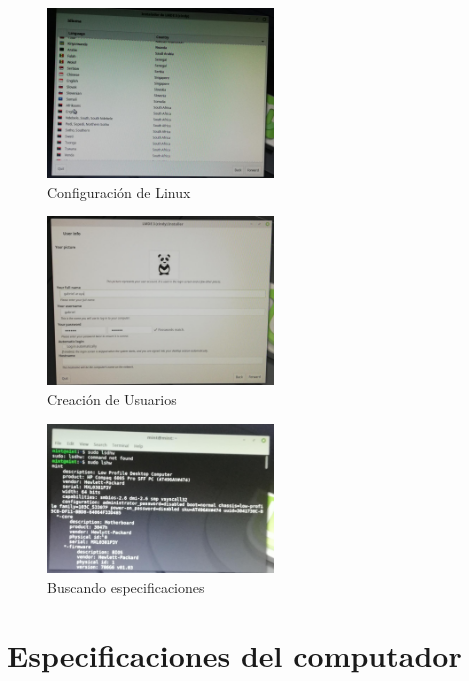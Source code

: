 \documentclass[
  letterpaper, 
  maincolor=black,
  sectioncolor=black!90,
  subsectioncolor=black!70,
  itemtextcolor=black!40,
]{fortysecondscv}
\begin{document}
    
    \begin{figure}
        \begin{center}
            \includegraphics[width=6cm,lenght=5cm]{img/imagen2.jpg}    
        \end{center}
        \caption{Configuración de Linux}
    \end{figure}
    
    
    \begin{figure}
        \begin{center}
            \includegraphics[width=6cm,lenght=5cm]{img/imagen3.jpg}    
        \end{center}
        \caption{Creación de Usuarios}
    \end{figure}
    
    \begin{figure}
        \begin{center}
            \includegraphics[width=6cm,lenght=5cm]{img/imagen4.jpg}    
        \end{center}
        \caption{Buscando especificaciones}
    \end{figure}

\newpage
    \section{Especificaciones del computador}
\end{document}

